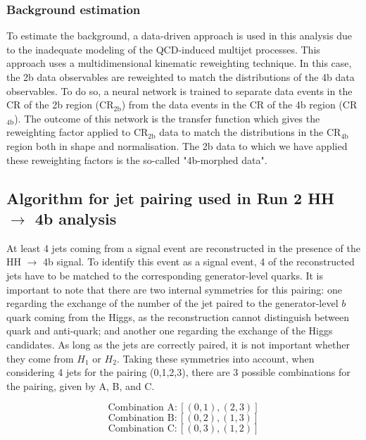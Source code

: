 \subsubsection{Background estimation} \label{subsection: bckg estimation}

To estimate the background, a data-driven approach is used in this analysis due to the inadequate modeling of the QCD-induced multijet processes. This approach uses a multidimensional kinematic reweighting technique. In this case, the 2b data observables are reweighted to match the distributions of the 4b data observables. To do so, a neural network is trained to separate data events in the CR of the 2b region (CR$_{\text{2b}}$) from the data events in the CR of the 4b region (CR$_{\text{4b}}$). The outcome of this network is the transfer function which gives the reweighting factor applied to CR$_{\text{2b}}$ data to match the distributions in the  CR$_{\text{4b}}$ region both in shape and normalisation. The 2b data to which we have applied these reweighting factors is the so-called "4b-morphed data".


\subsection{Algorithm for jet pairing used in Run 2 HH $\to$ 4b analysis} \label{subsection: run2 pairing}

At least 4 jets coming from a signal event are reconstructed in the presence of the HH $\to$ 4b signal. To identify this event as a signal event, 4 of the reconstructed jets have to be matched to the corresponding generator-level quarks. It is important to note that there are two internal symmetries for this pairing: one regarding the exchange of the number of the jet paired to the generator-level $b$ quark coming from the Higgs, as the reconstruction cannot distinguish between quark and anti-quark; and another one regarding the exchange of the Higgs candidates. As long as the jets are correctly paired, it is not important whether they come from $H_1$ or $H_2$. Taking these symmetries into account, when considering 4 jets for the pairing (0,1,2,3), there are 3 possible combinations for the pairing, given by A, B, and C.

\begin{equation*}
   \text{Combination A}:[(0,1),(2,3)] 
\end{equation*}
\begin{equation*}
   \text{Combination B}:[(0,2),(1,3)] 
\end{equation*}
\begin{equation*}
   \text{Combination C}:[(0,3),(1,2)] 
\end{equation*}

